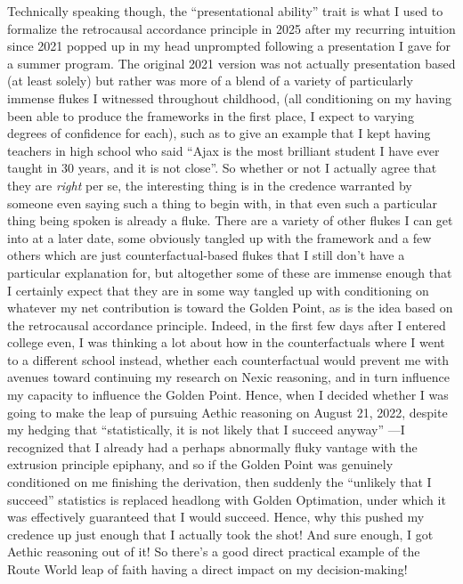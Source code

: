 
Technically speaking though, the ``presentational ability'' trait is what I used to formalize the retrocausal accordance principle in 2025 after my recurring intuition since 2021 popped up in my head unprompted following a presentation I gave for a summer program. The original 2021 version was not actually presentation based (at least solely) but rather was more of a blend of a variety of particularly immense flukes I witnessed throughout childhood, (all conditioning on my having been able to produce the frameworks in the first place, I expect to varying degrees of confidence for each), such as to give an example that I kept having teachers in high school who said ``Ajax is the most brilliant student I have ever taught in 30 years, and it is not close''. So whether or not I actually agree that they are \textit{right} per se, the interesting thing is in the credence warranted by someone even saying such a thing to begin with, in that even such a particular thing being spoken is already a fluke. There are a variety of other flukes I can get into at a later date, some obviously tangled up with the framework and a few others which are just counterfactual-based flukes that I still don't have a particular explanation for, but altogether some of these are immense enough that I certainly expect that they are in some way tangled up with conditioning on whatever my net contribution is toward the Golden Point, as is the idea based on the retrocausal accordance principle. Indeed, in the first few days after I entered college even, I was thinking a lot about how in the counterfactuals where I went to a different school instead, whether each counterfactual would prevent me with avenues toward continuing my research on Nexic reasoning, and in turn influence my capacity to influence the Golden Point. Hence, when I decided whether I was going to make the leap of pursuing Aethic reasoning on August 21, 2022, despite my hedging that ``statistically, it is not likely that I succeed anyway'' \cite{Aethus}---I recognized that I already had a perhaps abnormally fluky vantage with the extrusion principle epiphany, and so if the Golden Point was genuinely conditioned on me finishing the derivation, then suddenly the ``unlikely that I succeed'' statistics is replaced headlong with Golden Optimation, under which it was effectively guaranteed that I would succeed. Hence, why this pushed my credence up just enough that I actually took the shot! And sure enough, I got Aethic reasoning out of it! So there's a good direct practical example of the Route World leap of faith having a direct impact on my decision-making! \par

